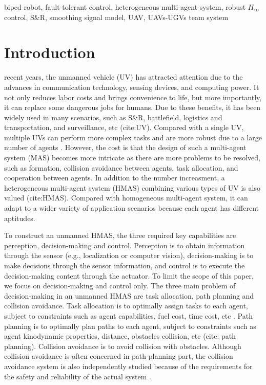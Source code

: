 \documentclass{ieeeaccess}
\begin{document}
\begin{keywords}
biped robot, fault-tolerant control, heterogeneous multi-agent system, robust $H_\infty$ control, S\&R, smoothing signal model, UAV, UAVs-UGVs team system
\end{keywords}

\titlepgskip=-15pt

\maketitle

\section{Introduction}
 recent years, the unmanned vehicle (UV) has attracted attention due to the advances in communication technology, sensing devices, and computing power. It not only reduces labor costs and brings convenience to life, but more importantly, it can replace some dangerous jobs for humans. Due to these benefits, it has been widely used in many scenarios, such as S\&R, battlefield, logistics and transportation, and surveillance, etc (cite:UV). Compared with a single UV, multiple UVs can perform more complex tasks and are more robust due to a large number of agents \cite{8352646}. However, the cost is that the design of such a multi-agent system (MAS) becomes more intricate as there are more problems to be resolved, such as formation, collision avoidance between agents, task allocation, and cooperation between agents. In addition to the number increasment, a heterogeneous multi-agent system (HMAS) combining various types of UV is also valued (cite:HMAS). Compared with homogeneous multi-agent system, it can adapt to a wider variety of application scenarios because each agent has different aptitudes.

To construct an unmanned HMAS, the three required key capabilities are perception, decision-making and control. Perception is to obtain information through the sensor (e.g., localization or computer vision), decision-making is to make decisions through the sensor information, and control is to execute the decision-making content through the actuator. To limit the scope of this paper, we focus on decision-making and control only. The three main problem of decision-making in an unmanned HMAS are task allocation, path planning and collision avoidance. Task allocation is to optimally assign tasks to each agent, subject to constraints such as agent capabilities, fuel cost, time cost, etc \cite{9476736}. Path planning is to optimally plan paths to each agent, subject to constraints such as agent kinodynamic properties, distance, obstacles collision, etc (cite: path planning). Collision avoidance is to avoid collision with obstacles. Although collision avoidance is often concerned in path planning part, the collision avoidance system is also independently studied because of the requirements for the safety and reliability of the actual system \cite{9108245}.
\end{document}
